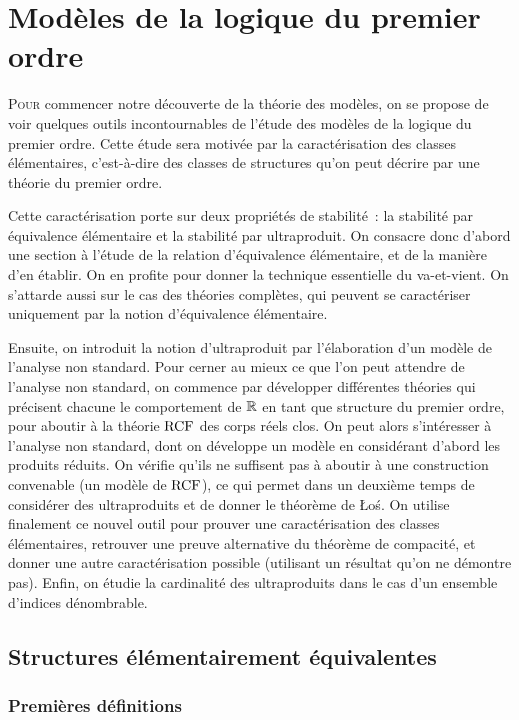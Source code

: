 \chapter{Modèles de la logique du premier ordre}
\label{chp.elem}

\minitoc

\lettrine{P}{our} commencer notre découverte de la théorie des modèles, on se
propose de voir quelques outils incontournables de l'étude des modèles de la
logique du premier ordre. Cette étude sera motivée par la caractérisation des
classes élémentaires, c'est-à-dire des classes de structures qu'on peut décrire
par une théorie du premier ordre.

Cette caractérisation porte sur deux propriétés de stabilité~: la stabilité par
équivalence élémentaire et la stabilité par ultraproduit. On consacre donc
d'abord une section à l'étude de la relation d'équivalence élémentaire, et de
la manière d'en établir. On en profite pour donner la technique essentielle du
va-et-vient. On s'attarde aussi sur le cas des théories complètes, qui
peuvent se caractériser uniquement par la notion d'équivalence élémentaire.

Ensuite, on introduit la notion d'ultraproduit par l'élaboration d'un modèle de
l'analyse non standard. Pour cerner au mieux ce que l'on peut attendre de
l'analyse non standard, on commence par développer différentes théories qui
précisent chacune le comportement de $\mathbb R$ en tant que structure du premier
ordre, pour aboutir à la théorie $\operatorname{RCF}$ des corps réels clos. On peut alors
s'intéresser à l'analyse non standard, dont on développe un modèle en
considérant d'abord les produits réduits. On vérifie qu'ils ne suffisent pas à
aboutir à une construction convenable (un modèle de $\operatorname{RCF}$), ce qui permet dans
un deuxième temps de considérer des ultraproduits et de donner le théorème de
Łoś. On utilise finalement ce nouvel outil pour prouver une caractérisation des
classes élémentaires, retrouver une preuve alternative du théorème de compacité,
et donner une autre caractérisation possible (utilisant un résultat qu'on ne
démontre pas). Enfin, on étudie la cardinalité des ultraproduits dans le cas
d'un ensemble d'indices dénombrable.

\section{Structures élémentairement équivalentes}

\subsection{Premières définitions}

